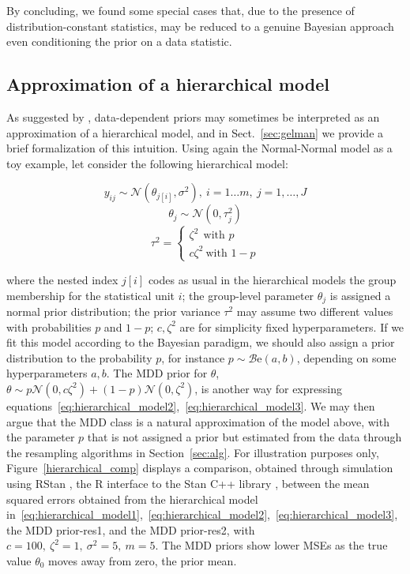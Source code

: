 \documentclass{statsoc}
\begin{document}
By concluding, we found some special cases that, due to the presence of distribution-constant statistics, may be reduced to a genuine Bayesian approach even conditioning the prior on a data statistic. 

\subsection{Approximation of a hierarchical model}

As suggested by \cite{gelmandatadependent}, data-dependent priors may sometimes be interpreted as an approximation of a hierarchical model, and in Sect.~\ref{sec:gelman} we provide a brief formalization of this intuition. Using again the Normal-Normal model as a toy example, let consider the following hierarchical model:

\begin{equation}
y_{ij}  \sim \mathcal{N}(\theta_{j[i]}, \sigma^{2}), \ i=1\ldots m, \ j=1,\ldots,J
\label{eq:hierarchical_model1}
\end{equation}
\begin{equation}
\theta_j \sim \mathcal{N}(0, \tau^{2}_{j})
\label{eq:hierarchical_model2}
\end{equation}
\begin{equation}
 \tau^{2}=\begin{cases}
\zeta^{2} \ \  \mbox{with } p \\
c\zeta^{2}  \ \mbox{with } 1-p
\end{cases}
\label{eq:hierarchical_model3}
\end{equation}

where the nested index $j[i]$ codes as usual in the hierarchical models \citep{gelman2006data} the group membership for the statistical unit $i$; the group-level parameter $\theta_{j}$ is assigned a normal prior distribution; the prior variance $\tau^2$ may assume two different values with probabilities $p$ and $1-p$; $c,\zeta^2$ are for simplicity fixed hyperparameters. If we fit this model according to the Bayesian paradigm, we should also assign a prior distribution to the probability $p$, for instance $p\sim \mathcal{B}\mbox{e}(a,b)$, depending on some hyperparameters $a,b$. The MDD prior for $\theta$, $\theta \sim p\mathcal{N}(0, c\zeta^2)+(1-p)\mathcal{N}(0, \zeta^2)$, is another way for expressing equations~\eqref{eq:hierarchical_model2},~\eqref{eq:hierarchical_model3}. We may then argue that the MDD class is a natural approximation of the model above, with the parameter $p$ that is not assigned a prior but estimated from the data through the resampling algorithms in Section~\ref{sec:alg}. 
For illustration purposes only, Figure~\ref{hierarchical_comp} displays a comparison, obtained through simulation using RStan \citep{rstan}, the R \citep{rcore} interface to
the Stan C++ library \citep{stan}, between the mean squared errors obtained from the hierarchical model in~\eqref{eq:hierarchical_model1},~\eqref{eq:hierarchical_model2},~\eqref{eq:hierarchical_model3}, the MDD prior-res1, and the MDD prior-res2, with $c=100, \ \zeta^2=1,\ \sigma^2=5,\ m=5$. The MDD priors show lower MSEs as the true value $\theta_{0}$ moves away from zero, the prior mean.
\end{document}
